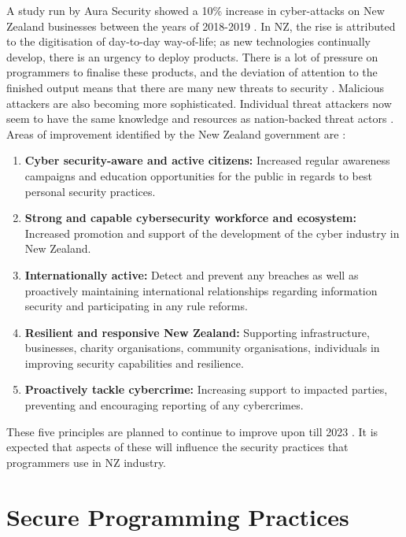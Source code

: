 \par A study run by Aura Security showed a 10\% increase in cyber-attacks on New Zealand businesses between the years of 2018-2019 \cite{aura}. In NZ, the rise is attributed to the digitisation of day-to-day way-of-life; as new technologies continually develop, there is an urgency to deploy products. There is a lot of pressure on programmers to finalise these products, and the deviation of attention to the finished output means that there are many new threats to security \cite{securitystrat}. Malicious attackers are also becoming more sophisticated. Individual threat attackers now seem to have the same knowledge and resources as nation-backed threat actors \cite{securitystrat}.
\newline
\newline
Areas of improvement identified by the New Zealand government are \cite{securitystrat}:

\begin{enumerate}
    \item \textbf{Cyber security-aware and active citizens:} Increased regular awareness campaigns and education opportunities for the public in regards to best personal security practices. 
    \item \textbf{Strong and capable cybersecurity workforce and ecosystem:} Increased promotion and support of the development of the cyber industry in New Zealand.
    \item \textbf{Internationally active:} Detect and prevent any breaches as well as proactively maintaining international relationships regarding information security and participating in any rule reforms. 
    \item \textbf{Resilient and responsive New Zealand:} Supporting infrastructure, businesses, charity organisations, community organisations, individuals in improving security capabilities and resilience.
    \item \textbf{Proactively tackle cybercrime:} Increasing support to impacted parties,  preventing and encouraging reporting of any cybercrimes. 
\end{enumerate}

\par These five principles are planned to continue to improve upon till 2023 \cite{securitystrat}. It is expected that aspects of these will influence the security practices that programmers use in NZ industry.

\section{Secure Programming Practices}

